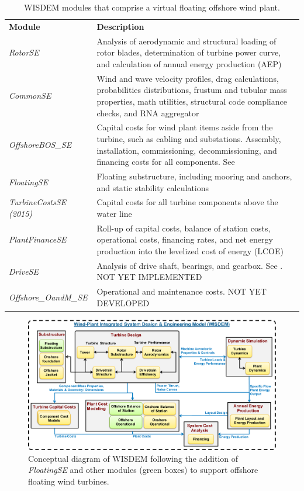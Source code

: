\begin{table}[htbp] \begin{center}
    \caption{WISDEM modules that comprise a virtual floating offshore
      wind plant.}
    \label{tbl:new_wisdem}
{\footnotesize
  \begin{tabularx}{\textwidth}{ l X } \hline
    \textbf{Module} & \textbf{Description} \\
\textit{RotorSE} & Analysis of aerodynamic and structural loading of rotor
  blades, determination of turbine power curve, and calculation of
  annual energy production (AEP)\\
\textit{CommonSE} & Wind and wave velocity profiles, drag calculations,
  probabilities distributions, frustum and tubular mass properties, math
  utilities, structural code compliance checks, and RNA aggregator\\
\textit{OffshoreBOS\_SE} & Capital costs for wind plant items aside from the
  turbine, such as cabling and substations.  Assembly, installation,
  commissioning, decommissioning, and financing costs for all
  components. See \citep{obos}\\
\textit{FloatingSE} & Floating substructure, including mooring and anchors, and
  static stability calculations\\
\textit{TurbineCostsSE (2015)} & Capital costs for all turbine components
  above the water line\\
\textit{PlantFinanceSE} & Roll-up of capital costs, balance of station
  costs, operational costs, financing rates, and net energy production
  into the levelized cost of energy (LCOE)\\
\textit{DriveSE} & Analysis of drive shaft, bearings, and gearbox.  See
  \citep{DriveSE}. NOT YET IMPLEMENTED\\
\textit{Offshore\_OandM\_SE} & Operational and maintenance costs.  NOT YET
    DEVELOPED\\
  \hline \end{tabularx}
}
\end{center} \end{table}

\begin{figure}[htb]
  \begin{center}
    \includegraphics[width=6in]{figs/new_wisdem.pdf}
    \caption{Conceptual diagram of WISDEM following the addition of
      \textit{FloatingSE} and other modules (green boxes) to support offshore floating
      wind turbines.}
    \label{fig:new_wisdem}
  \end{center}
\end{figure}


